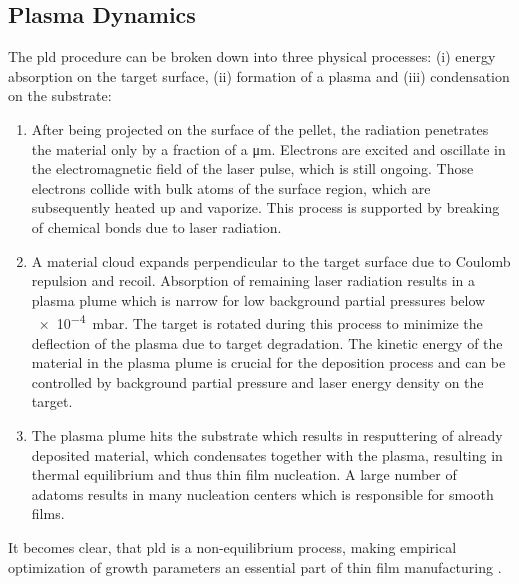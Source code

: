 \subsection{Plasma Dynamics}
The \gls{pld} procedure can be broken down into three physical processes: (i) energy absorption on the target surface, (ii) formation of a plasma and (iii) condensation on the substrate:
\begin{enumerate}[label=(\roman*)]
    \item After being projected on the surface of the pellet, the radiation penetrates the material only by a fraction of a \unit{\um}.
    Electrons are excited and oscillate in the electromagnetic field of the laser pulse, which is still ongoing.
    Those electrons collide with bulk atoms of the surface region, which are subsequently heated up and vaporize.
    This process is supported by breaking of chemical bonds due to laser radiation.
    \item A material cloud expands perpendicular to the target surface due to Coulomb repulsion and recoil.
    Absorption of remaining laser radiation results in a plasma plume which is narrow for low background partial pressures below \qty{e-4}{\milli\bar}.
    The target is rotated during this process to minimize the deflection of the plasma due to target degradation.
    The kinetic energy of the material in the plasma plume is crucial for the deposition process and can be controlled by background partial pressure and laser energy density on the target.
    \item The plasma plume hits the substrate which results in resputtering of already deposited material, which condensates together with the plasma, resulting in thermal equilibrium and thus thin film nucleation.
    A large number of adatoms results in many nucleation centers which is responsible for smooth films.
\end{enumerate}
It becomes clear, that \gls{pld} is a non-equilibrium process, making empirical optimization of growth parameters an essential part of thin film manufacturing
    \cite{lorenz2019}.

